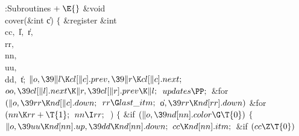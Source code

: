 \Y\B\4:Subroutines\X${}\mathrel+\E{}$\6
\1\1\&{void} \\{cover}(\&{int} \|c)\2\2\6
${}\{{}$\1\6
\&{register} \&{int} \\{cc}${},{}$ \|l${},{}$ \|r${},{}$ \\{rr}${},{}$ %
\\{nn}${},{}$ \\{uu}${},{}$ \\{dd}${},{}$ \|t;\7
${}\|o,\39\|l\K\\{cl}[\|c].\\{prev},\39\|r\K\\{cl}[\|c].\\{next};{}$\6
${}\\{oo},\39\\{cl}[\|l].\\{next}\K\|r,\39\\{cl}[\|r].\\{prev}\K\|l;{}$\6
${}\\{updates}\PP;{}$\6
\&{for} ${}(\|o,\39\\{rr}\K\\{nd}[\|c].\\{down};{}$ ${}\\{rr}\G\\{last%
\_itm};{}$ \|o${},\39\\{rr}\K\\{nd}[\\{rr}].\\{down}){}$\1\6
\&{for} ${}(\\{nn}\K\\{rr}+\T{1};{}$ ${}\\{nn}\I\\{rr};{}$ \,)\5
${}\{{}$\1\6
\&{if} ${}(\|o,\39\\{nd}[\\{nn}].\\{color}\G\T{0}){}$\5
${}\{{}$\1\6
${}\|o,\39\\{uu}\K\\{nd}[\\{nn}].\\{up},\39\\{dd}\K\\{nd}[\\{nn}].\\{down};{}$\6
${}\\{cc}\K\\{nd}[\\{nn}].\\{itm};{}$\6
\&{if} ${}(\\{cc}\Z\T{0}){}$\5
